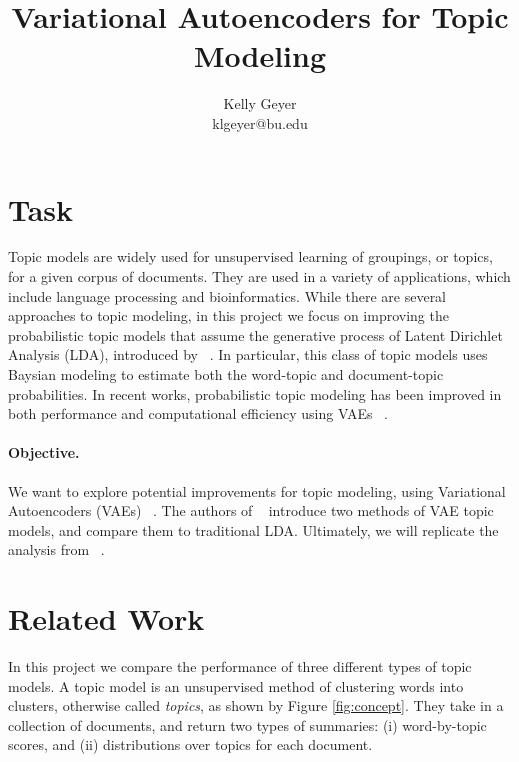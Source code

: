 \documentclass[10pt,twocolumn,letterpaper]{article}
\begin{document}
\title{Variational Autoencoders for Topic Modeling}
\author{Kelly Geyer\\
klgeyer@bu.edu}
\maketitle

\section{Task}
\noindent
Topic models are widely used for unsupervised learning of groupings, or topics, for a given corpus of documents. 
They are used in a variety of applications, which include language processing and bioinformatics. 
While there are several approaches to topic modeling, in this project we focus on improving the probabilistic topic models that assume the generative process of Latent Dirichlet Analysis (LDA), introduced by ~\cite{blei2012probabilistic}. 
In particular, this class of topic models uses Baysian modeling to estimate both the word-topic and document-topic probabilities. 
In recent works, probabilistic topic modeling has been improved in both performance and computational efficiency using VAEs ~\cite{miao2017discovering,srivastava2017autoencoding,burkhardt2019decoupling}. 

\paragraph{Objective.}
We want to explore potential improvements for topic modeling, using Variational Autoencoders (VAEs) ~\cite{kingma2013auto}. 
The authors of ~\cite{srivastava2017autoencoding} introduce two methods of VAE topic models, and compare them to traditional LDA.
Ultimately, we will replicate the analysis from ~\cite{srivastava2017autoencoding}.



\section{Related Work}
\noindent
In this project we compare the performance of three different types of topic models.
A topic model is an unsupervised method of clustering words into clusters, otherwise called \textit{topics}, as shown by Figure \ref{fig:concept}.
They take in a collection of documents, and return two types of summaries: (i) word-by-topic scores, and (ii) distributions over topics for each document.
\end{document}
